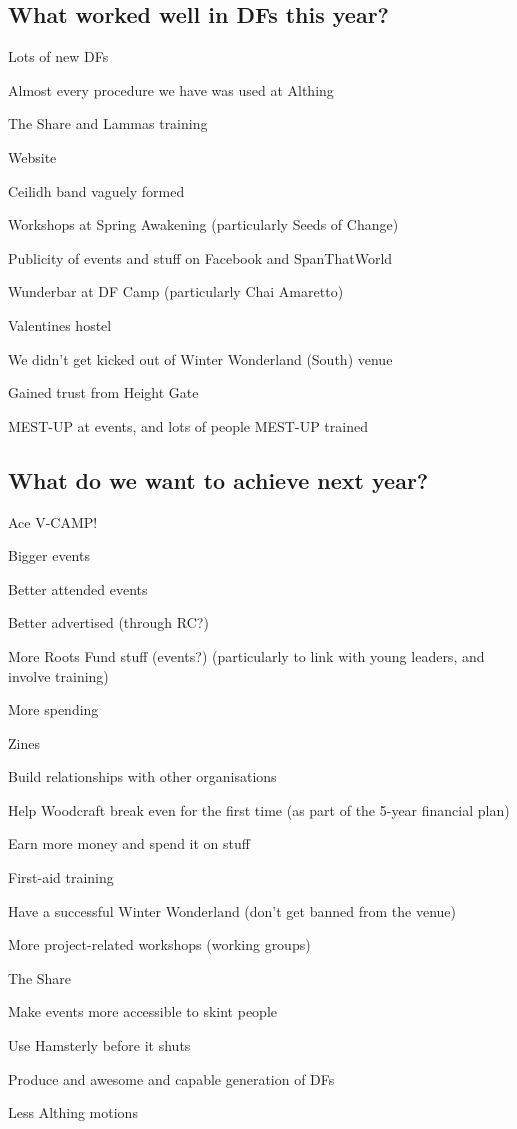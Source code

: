 \documentclass[a4paper, 12pt]{article}
\begin{document}
\subsection{What worked well in DFs this year?}
\begin{itemize*}
	\item Lots of new DFs
	\item Almost every procedure we have was used at Althing
	\item The Share and Lammas training
	\item Website
	\item Ceilidh band vaguely formed
	\item Workshops at Spring Awakening (particularly Seeds of Change)
	\item Publicity of events and stuff on Facebook and SpanThatWorld
	\item Wunderbar at DF Camp (particularly Chai Amaretto)
	\item Valentines hostel
	\item We didn't get kicked out of Winter Wonderland (South) venue
	\item Gained trust from Height Gate
	\item MEST-UP at events, and lots of people MEST-UP trained
\end{itemize*}

\subsection{What do we want to achieve next year?}
\begin{itemize*}
	\item Ace V-CAMP!
	\item Bigger events
	\item Better attended events
	\item Better advertised (through RC?)
	\item More Roots Fund stuff (events?) (particularly to link with young leaders, and involve training)
	\item More spending
	\item Zines
	\item Build relationships with other organisations
	\item Help Woodcraft break even for the first time (as part of the 5-year financial plan)
	\item Earn more money and spend it on stuff
	\item First-aid training
	\item Have a successful Winter Wonderland (don't get banned from the venue)
	\item More project-related workshops (working groups)
	\item The Share
	\item Make events more accessible to skint people
	\item Use Hamsterly before it shuts
	\item Produce and awesome and capable generation of DFs
	\item Less Althing motions
\end{itemize*}
\end{document}
